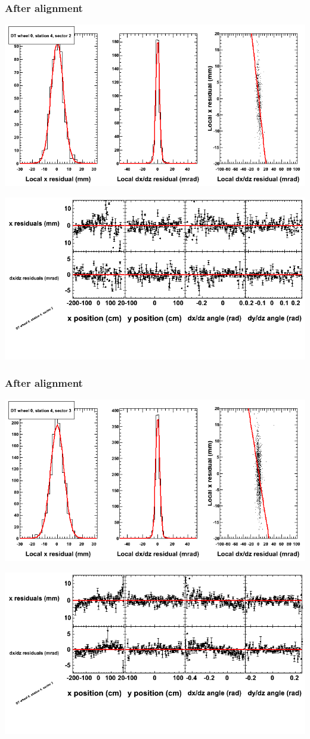 \documentclass[compress]{beamer}
\begin{document}
\begin{frame}
\frametitle{After alignment}
\includegraphics[width=0.7\linewidth]{NOV4_fitfunctions/MBwhCst4sec02_bellcurves.png}

\includegraphics[width=0.7\linewidth]{NOV4_fitfunctions/MBwhCst4sec02_polynomials.png}
\end{frame}

\begin{frame}
\frametitle{After alignment}
\includegraphics[width=0.7\linewidth]{NOV4_fitfunctions/MBwhCst4sec03_bellcurves.png}

\includegraphics[width=0.7\linewidth]{NOV4_fitfunctions/MBwhCst4sec03_polynomials.png}
\end{frame}
\end{document}
